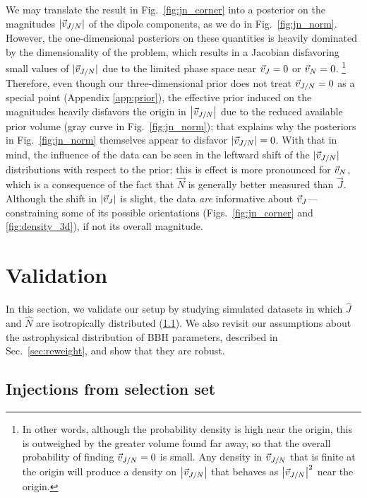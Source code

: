 \documentclass[twocolumn,twocolappendix,linenumbers]{aastex631}
\begin{document}
We may translate the result in Fig.~\ref{fig:jn_corner} into a posterior on the magnitudes $|\vec{v}_{J/N}|$ of the dipole components, as we do in Fig.~\ref{fig:jn_norm}.
However, the one-dimensional posteriors on these quantities is heavily dominated by the dimensionality of the problem, which results in a Jacobian disfavoring small values of $|\vec{v}_{J/N}|$ due to the limited phase space near $\vec{v}_{J}=0$ or $\vec{v}_{N} = 0$.%
\footnote{In other words, although the probability density is high near the origin, this is outweighed by the greater volume found far away, so that the overall probability of finding $\vec{v}_{J/N}=0$ is small.  Any density in $\vec{v}_{J/N}$ that is finite at the origin will produce a density on $\left| \vec{v}_{J/N} \right|$ that behaves as $\left| \vec{v}_{J/N} \right|^2$ near the origin.}
Therefore, even though our three-dimensional prior does not treat $\vec{v}_{J/N} = 0$ as a special point (Appendix \ref{app:prior}), the effective prior induced on the magnitudes heavily disfavors the origin in $\left| \vec{v}_{J/N} \right|$ due to the reduced available prior volume (gray curve in Fig.~\ref{fig:jn_norm}); that explains why the posteriors in Fig.~\ref{fig:jn_norm} themselves appear to disfavor $|\vec{v}_{J/N}| = 0$.
With that in mind, the influence of the data can be seen in the leftward shift of the $|\vec{v}_{J/N}|$ distributions with respect to the prior; this is effect is more pronounced for $\vec{v}_{N}$, which is a consequence of the fact that $\vec{N}$ is generally better measured than $\vec{J}$.
Although the shift in $|\vec{v}_{J}|$ is slight, the data \emph{are} informative about $\vec{v}_{J}$---constraining some of its possible orientations (Figs.~\ref{fig:jn_corner} and \ref{fig:density_3d}), if not its overall magnitude.

\section{Validation}
\label{sec:validation}

In this section, we validate our setup by studying simulated datasets in which $\hat{J}$ and $\hat{N}$ are isotropically distributed (\ref{sec:validation:selection}).
We also revisit our assumptions about the astrophysical distribution of \ac{BBH} parameters, described in Sec.~\ref{sec:reweight}, and show that they are robust.

\subsection{Injections from selection set}
\label{sec:validation:selection}
\end{document}
